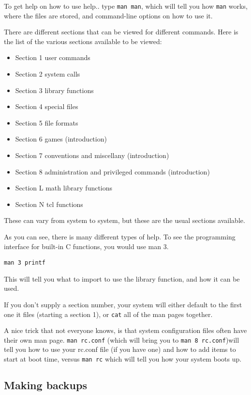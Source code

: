 To get help on how to use help.. type {\tt man man}, which will 
tell you how {\tt man} works, where the files are stored, and 
command-line options on how to use it.

There are different sections that can be viewed for different commands.
Here is the list of the various sections available to be viewed:

\begin{itemize}
\item Section 1
user commands 
\item Section 2
system calls 
\item Section 3
library functions 
\item Section 4
special files 
\item Section 5
file formats 
\item Section 6
games (introduction)
\item Section 7
conventions and miscellany (introduction)
\item Section 8
administration and privileged commands (introduction)
\item Section L
math library functions
\item Section N
tcl functions
\end{itemize}

These can vary from system to system, but these are the usual sections available.

As you can see, there is many different types of help. To see the programming interface for 
built-in C functions, you would use man 3.

\begin{verbatim}
man 3 printf    
\end{verbatim}

This will tell you what to import to use the library function, and how it 
can be used.

If you don't supply a section number, your system will either default to the first one it files (starting a section 1), or {\tt cat}
all of the man pages together.

A nice trick that not everyone knows, is that system configuration files 
often have their own man page. {\tt man rc.conf} (which will bring you to {\tt man 8 rc.conf})will tell you 
how to use your rc.conf file (if you have one) and how to add items to start at boot time, versus {\tt man rc}
which will tell you how your system boots up.


\subsection {Making backups}


